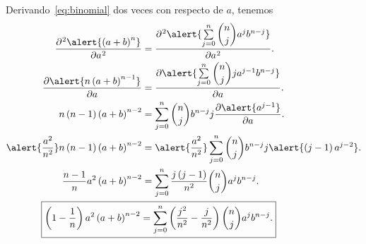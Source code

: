 \begin{frame}
    Derivando~\eqref{eq:binomial} dos veces con respecto de $a$,
    tenemos
    \begin{align}
        \diffp[2]{
            \alert{
                \left(a+b\right)^{n}
            }
        }{a}                   & =
        \diffp[2]{
            \alert{
                \sum\limits_{j=0}^{n}
                \dbinom{n}{j}
                a^{j}
                b^{n-j}
            }
        }{a}.   \notag             \\
        \diffp{
            \alert{
                n\left(a+b\right)^{n-1}
            }
        }{a}                   & =
        \diffp{
            \alert{
                \sum\limits_{j=0}^{n}
                \dbinom{n}{j}
                ja^{j-1}
                b^{n-j}
            }
        }{a}.         \notag       \\
        n\left(n-1\right)
        \left(a+b\right)^{n-2} & =
        \sum\limits_{j=0}^{n}
        \dbinom{n}{j}
        b^{n-j}
        j
        \diffp{
            \alert{
                a^{j-1}
            }
        }{a}.               \notag \\
        \alert{
            \dfrac{a^{2}}{n^{2}}
        }
        n\left(n-1\right)
        \left(a+b\right)^{n-2} & =
        \alert{
            \dfrac{a^{2}}{n^{2}}
        }
        \sum\limits_{j=0}^{n}
        \dbinom{n}{j}
        b^{n-j}
        j
        \alert{
            \left(j-1\right)
            a^{j-2}
        }.                \notag   \\
        \dfrac{n-1}{n}
        a^{2}
        \left(a+b\right)^{n-2}
                               & =
        \sum\limits_{j=0}^{n}
        \dfrac{j\left(j-1\right)}{n^{2}}
        \dbinom{n}{j}
        a^{j}
        b^{n-j}.          \notag   \\
        \label{eq:binomial_II}
        \Aboxed{
            \left(1-\dfrac{1}{n}\right)
            a^{2}
            \left(a+b\right)^{n-2}
                               & =
            \sum\limits_{j=0}^{n}
            \left(
            \dfrac{j^{2}}{n^{2}}-
            \dfrac{j}{n^{2}}
            \right)
            \dbinom{n}{j}
            a^{j}
            b^{n-j}.
        }
    \end{align}
\end{frame}

